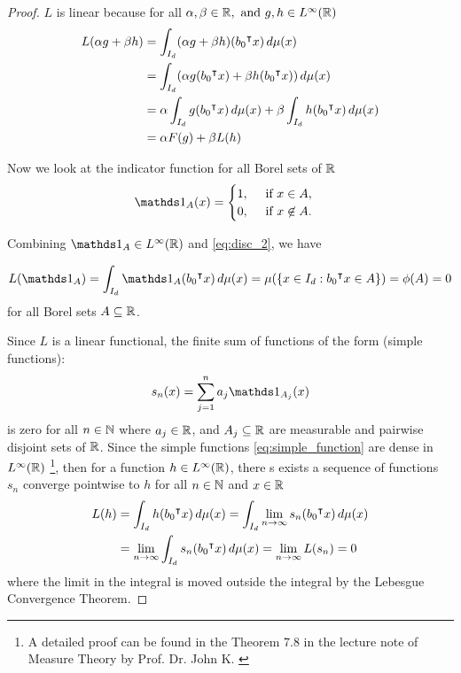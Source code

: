 \begin{proof}
    $L$ is linear because for all $\alpha, \beta \in \mathbb{R}, \text{ and } g, h \in
    L^{\infty}(\mathbb{R})$
    \begin{align*}
        L(\alpha g + \beta h)
        &= \int_{I_d} (\alpha g + \beta h) (b_0{}^{\intercal} x) \,d\mu(x) \\
        &= \int_{I_d} (\alpha g(b_0{}^{\intercal} x) + \beta h (b_0{}^{\intercal} x)) \, d\mu(x) \\
        &= \alpha \int_{I_d} g(b_0{}^{\intercal} x) \,d\mu(x) 
            + \beta \int_{I_d} h(b_0{}^{\intercal} x) \,d\mu(x) \\
        &= \alpha F(g) + \beta L(h)
    \end{align*}

    Now we look at the indicator function for all Borel sets of $\mathbb{R}$
    \begin{equation}
        \indicator{A}(x) =
        \begin{cases}
            1, \quad \text{ if } x \in A, \\
            0, \quad \text{ if } x \not\in A.
        \end{cases}
    \end{equation}

    Combining $\indicator{A} \in \lp{\infty}(\R)$ and \eqref{eq:disc_2}, we
    have 

    \begin{equation}
        L(\indicator{A}) = \int_{I_d} \indicator{A}(b_0\tr x)\,d\mu(x)
        = \mu(\{ x\in I_d: b_0\tr x\in A \}) = \phi(A) = 0
    \end{equation}
    for all Borel sets $A \subseteq \mathbb{R}$.

    Since $L$ is a linear functional, the finite sum of functions of the form
    (simple functions):
    \begin{equation}
        \label{eq:simple_function}
        s_n(x) = \sum_{j=1}^{n} a_j \indicator{A_j}(x)
    \end{equation}
    is zero for all $n\in\mathbb{N}$ where $a_j \in \mathbb{R}$, and ${A_j} \subseteq \mathbb{R}$ are
    measurable and pairwise disjoint sets of $\mathbb{R}$. Since the simple functions
    \eqref{eq:simple_function} are dense in $L^{\infty}(\mathbb{R})$ \citep[Proposition
    6.7]{alma991031140799705251} \footnote{A detailed proof can be found in the
    Theorem 7.8 in the lecture note of Measure Theory by Prof. Dr. John K.
    \cite{hunterSpaces2011}}, then for a function $h \in L^{\infty}(\mathbb{R})$, there
    s exists a sequence of functions $s_n$ converge pointwise to $h$ for all $n
    \in \mathbb{N}$ and $x \in \mathbb{R}$
    \begin{align}
        L(h) &= \int_{I_d} h(b_0{}^{\intercal} x) \,d\mu(x) 
             = \int_{I_d} \lim_{n\to\infty} s_n(b_0{}^{\intercal} x) \,d\mu(x) \\
             &= \lim_{n\to\infty} \int_{I_d} s_n(b_0{}^{\intercal} x) \,d\mu(x)
             = \lim_{n\to\infty} L(s_n)
             = 0
    \end{align}
    where the limit in the integral is moved outside the integral by the
    Lebesgue Convergence Theorem.


\end{proof}
